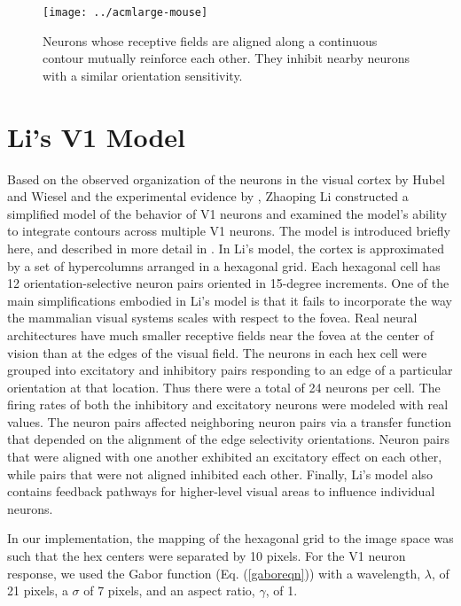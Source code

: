 \documentclass[prodmode,hillsideplop]{../acmlarge}
\begin{document}
\begin{figure}[tp]
\centering
\texttt{[image: ../acmlarge-mouse]}
\caption{Neurons whose receptive fields are aligned along a
continuous contour mutually reinforce each other. They inhibit nearby
neurons with a similar orientation sensitivity.}
\label{neuronalignmentfig}
\end{figure}


\section{Li's V1 Model}
Based on the observed organization of the neurons in the visual
cortex by Hubel and Wiesel \citeyear{Hubel1962,Hubel1968} and the
experimental evidence by , Zhaoping Li constructed a
simplified model of the behavior of V1 neurons and examined the
model's ability to integrate contours across multiple V1 neurons.
The model is introduced briefly here, and described in more detail in
. In Li's model, the cortex is approximated by a set
of hypercolumns arranged in a hexagonal grid. Each hexagonal cell has
12 orientation-selective neuron pairs oriented in 15-degree
increments. One of the main simplifications embodied in Li's model is
that it fails to incorporate the way the mammalian visual systems
scales with respect to the fovea. Real neural architectures have much
smaller receptive fields near the fovea at the center of vision than
at the edges of the visual field.
The neurons in each hex cell were grouped into excitatory and
inhibitory pairs responding to an edge of a particular orientation at
that location. Thus there were a total of 24 neurons per cell. The
firing rates of both the inhibitory and excitatory neurons were
modeled with real values. The neuron pairs affected neighboring
neuron pairs via a transfer function that depended on the alignment
of the edge selectivity orientations. Neuron pairs that were aligned
with one another exhibited an excitatory effect on each other, while
pairs that were not aligned inhibited each other. Finally, Li's model
also contains feedback pathways for higher-level visual areas to
influence individual neurons.

In our implementation, the mapping of the hexagonal grid to the image
space was such that the hex centers were separated by 10 pixels. For
the V1 neuron response, we used the Gabor function (Eq.
(\ref{gaboreqn})) with a wavelength, $\lambda$, of 21 pixels, a
$\sigma$ of 7 pixels, and an aspect ratio, $\gamma$, of 1.
\end{document}
